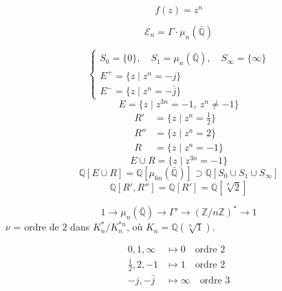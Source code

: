 \documentclass[11pt,a4paper]{article}
\begin{document}
\[
  f(z) = z^n
\]


\[
  \mathcal{E}_n = \Gamma \cdot \mu_n(\bar{\mathbb{Q}})
\]

\[
  \begin{cases}
    S_0 = \{0\}, \quad S_1 = \mu_n(\bar{\mathbb{Q}}), \quad S_\infty = \{\infty\} \\
    E^{+} = \{z \mid z^n = -j\} \\
    E^{-} = \{z \mid z^n = -\bar{j}\}
  \end{cases}
\]
\[
  E = \bigl\{z \mid z^{3n} = -1,\ z^n \neq -1\bigr\}
\]
\[
  \begin{aligned}
    R' &= \{z \mid z^n = \tfrac{1}{2}\} \\
    R'' &= \{z \mid z^n = 2\} \\
    R &= \{z \mid z^n = -1\}
  \end{aligned}
\]
\[
  E \cup R = \{z \mid z^{3n} = -1\}
\]
\[
  \mathbb{Q}[E \cup R] = \mathbb{Q}[\mu_{6n}(\bar{\mathbb{Q}})] \supset \mathbb{Q}[S_0 \cup S_1 \cup S_\infty]
\]
\[
  \mathbb{Q}[R', R''] = \mathbb{Q}[R'] = \mathbb{Q}[\sqrt[n]{2}]
\]


\[
  1 \to \mu_{n}(\bar{\mathbb{Q}}) \longrightarrow \Gamma' \longrightarrow (\mathbb{Z}/n\mathbb{Z})^{*} \to 1
\]
$\nu$ = ordre de $2$ dans \struck{\ill{}} $K_n^{*}/K_n^{*n}$, où $K_n = \mathbb{Q}(\sqrt[n]{1})$.

\[
  \begin{aligned}
    0, 1, \infty &\longmapsto 0 \quad \text{ordre } 2 \\
    \tfrac{1}{2}, 2, -1 &\longmapsto 1 \quad \text{ordre } 2 \\
    -j, -\bar{j} &\longmapsto \infty \quad \text{ordre } 3
  \end{aligned}
\]
\end{document}
